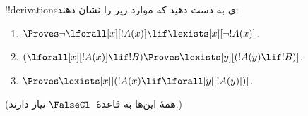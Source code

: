 \documentclass[../../../include/open-logic-section]{subfiles}
\begin{document}
\begin{prob}
!!{derivation}sی به دست دهید که موارد زیر را نشان دهند:
\begin{enumerate}
\item $\Proves \lnot\lforall[x][!A(x)] \lif \lexists[x][\lnot!A(x)]$.
\item $(\lforall[x][!A(x)] \lif !B) \Proves \lexists[y][(!A(y) \lif !B)]$.
\item $\Proves \lexists[x][(!A(x) \lif \lforall[y][!A(y)])]$.
\end{enumerate}
(همهٔ این‌ها به قاعدهٔ~$\FalseCl$ نیاز دارند.)
\end{prob}
\end{document}
